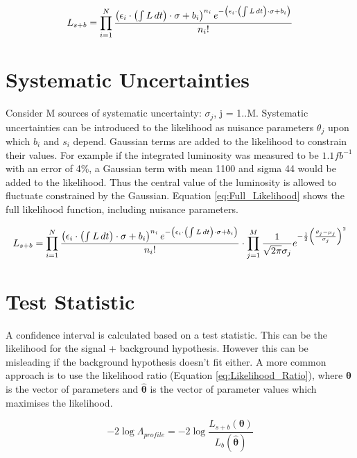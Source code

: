 \begin{equation}
L_{s+b} = \prod_{i=1}^{N}
\frac{\left(\epsilon_{i} \cdot \left(\int L\,dt\right) \cdot \sigma+b_{i}\right)^{n_{i}}e^{-\left(\epsilon_{i} \cdot \left(\int L\,dt\right) \cdot \sigma+b_{i}\right)}}{n_{i}!} 
\label{eq:SignalPlusBackground_Rewritten}
\end{equation}

\section{Systematic Uncertainties}

Consider M sources of systematic uncertainty: $\sigma_{j}$, j = 1..M. Systematic
uncertainties can be introduced to the likelihood as nuisance parameters 
$\theta_{j}$ upon which $b_{i}$ and $s_{i}$ depend. Gaussian terms are added to 
the likelihood to constrain their values. For example if the integrated 
luminosity was measured to be $1.1 \unit{fb^{-1}}$ with an error of 4\unit{\%}, a Gaussian term 
with mean 1100 and sigma 44 would be added to the likelihood. Thus the central
value of the luminosity is allowed to fluctuate constrained by the Gaussian.
Equation \ref{eq:Full_Likelihood} shows the full likelihood function, including 
nuisance parameters. 

\begin{equation}
L_{s+b} = \prod_{i=1}^{N}
\frac{\left(\epsilon_{i} \cdot \left(\int L\,dt\right) \cdot \sigma+b_{i}\right)^{n_{i}}e^{-\left(\epsilon_{i} \cdot \left(\int L\,dt\right) \cdot \sigma+b_{i}\right)}}{n_{i}!} 
\cdot \prod_{j=1}^{M} \frac{1}{\sqrt{2\pi}\sigma_{j}}e^{-\frac{1}{2}\left(\frac{\theta_{j} - \mu_{j}}{\sigma_{j}}\right)^{2}} 
\label{eq:Full_Likelihood}
\end{equation}

\section{Test Statistic}

A confidence interval is calculated based on a test statistic. This can be the 
likelihood for the signal + background hypothesis. However this can be misleading
if the background hypothesis doesn't fit either. A more common approach is to 
use the likelihood ratio (Equation \ref{eq:Likelihood_Ratio}), where 
$\boldsymbol\theta$ is the vector of parameters and $\hat{\boldsymbol\theta}$
is the vector of parameter values which maximises the likelihood. 

\begin{equation}
-2\log\Lambda_{profile} = -2\log\frac{L_{s+b}(\boldsymbol\theta)}{L_{b}(\hat{\boldsymbol\theta})}
\label{eq:Likelihood_Ratio}
\end{equation}

